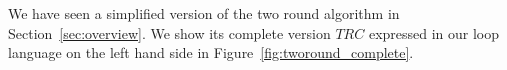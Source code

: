   We have seen a simplified version of the two round algorithm in Section~\ref{sec:overview}. We show its complete version $TRC$ expressed in our loop language on the left hand side in Figure~\ref{fig:tworound_complete}.
 
 
 
 

 

